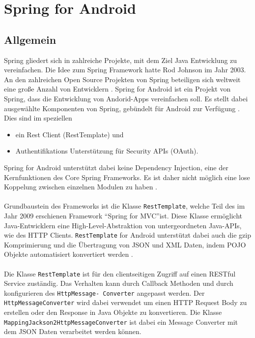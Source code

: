 \newpage
\section{Spring for Android}

\subsection{Allgemein}
Spring gliedert sich in zahlreiche Projekte, mit dem Ziel Java Entwicklung zu vereinfachen. Die Idee zum Spring Framework hatte Rod Johnson im Jahr 2003. An den zahlreichen Open Source Projekten von Spring  beteiligen sich weltweit eine große Anzahl von Entwicklern \cite{springITWissen}. Spring for Android ist ein Projekt von Spring, dass die Entwicklung von Andorid-Apps vereinfachen soll. Es stellt dabei ausgewählte Komponenten von Spring, gebündelt für Android zur Verfügung \cite{springForAndroid:website}. Dies sind im speziellen 

\begin{itemize}
	\item ein Rest Client (RestTemplate) und
	\item Authentifikations Unterstützung für Security APIs (OAuth).
\end{itemize}

Spring for Android unterstützt dabei keine Dependency Injection, eine der Kernfunktionen des Core Spring Frameworks. Es ist daher nicht möglich eine lose Koppelung zwischen einzelnen Modulen zu haben \cite{springForAndroid:dahanne}.
\\\\
Grundbaustein des Frameworks ist die Klasse \texttt{RestTemplate}, welche Teil des im Jahr 2009 erschienen Framework \textquotedblleft Spring for MVC\textquotedblright ist. Diese Klasse ermöglicht Java-Entwicklern eine High-Level-Abstraktion von untergeordneten Java-APIs, wie des HTTP Clients. \texttt{RestTemplate} for Android unterstützt dabei auch die gzip Komprimierung und die Übertragung von \acrfull{JSON} und \acrfull{XML} Daten, indem \acrfull{POJO} Objekte automatisiert konvertiert werden \cite{springForAndroid:dahanne}.
\\\\
Die Klasse \texttt{RestTemplate} ist für den clientseitigen Zugriff auf einen RESTful Service zuständig. Das Verhalten kann durch Callback Methoden und durch konfigurieren des \texttt{HttpMessage- Converter} angepasst werden. Der \texttt{HttpMessageConverter} wird dabei verwendet um einen HTTP Request Body zu erstellen oder den Response in Java Objekte zu konvertieren. Die Klasse \texttt{MappingJackson2HttpMessageConverter} ist dabei ein Message Converter mit dem JSON Daten verarbeitet werden können.

